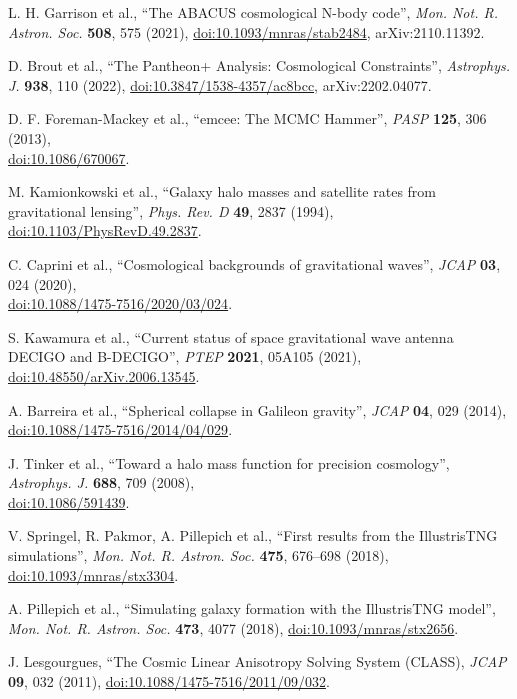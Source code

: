 \documentclass[aps,prd,twocolumn,superscriptaddress,nofootinbib,floatfix,preprintnumbers]{revtex4-2}
\begin{document}
\begin{thebibliography}{99}
L. H. Garrison et al.,
``The ABACUS cosmological N-body code'',
\emph{Mon. Not. R. Astron. Soc.} \textbf{508}, 575 (2021),
\href{https://doi.org/10.1093/mnras/stab2484}{doi:10.1093/mnras/stab2484},
arXiv:2110.11392.

D. Brout et al.,
``The Pantheon+ Analysis: Cosmological Constraints'',
\emph{Astrophys. J.} \textbf{938}, 110 (2022),
\href{https://doi.org/10.3847/1538-4357/ac8bcc}{doi:10.3847/1538-4357/ac8bcc},
arXiv:2202.04077.

D. F. Foreman-Mackey et al., 
``emcee: The MCMC Hammer'', 
\emph{PASP} \textbf{125}, 306 (2013), \\
\href{https://doi.org/10.1086/670067}{doi:10.1086/670067}.

M. Kamionkowski et al., 
``Galaxy halo masses and satellite rates from gravitational lensing'', 
\emph{Phys. Rev. D} \textbf{49}, 2837 (1994), \\
\href{https://doi.org/10.1103/PhysRevD.49.2837}{doi:10.1103/PhysRevD.49.2837}.

C. Caprini et al., 
``Cosmological backgrounds of gravitational waves'', 
\emph{JCAP} \textbf{03}, 024 (2020), \\
\href{https://doi.org/10.1088/1475-7516/2020/03/024}{doi:10.1088/1475-7516/2020/03/024}.

S. Kawamura et al., 
``Current status of space gravitational wave antenna DECIGO and B-DECIGO'', 
\emph{PTEP} \textbf{2021}, 05A105 (2021), \\
\href{https://doi.org/10.48550/arXiv.2006.13545}{doi:10.48550/arXiv.2006.13545}.

A. Barreira et al., 
``Spherical collapse in Galileon gravity'', 
\emph{JCAP} \textbf{04}, 029 (2014), \\
\href{https://doi.org/10.1088/1475-7516/2014/04/029}{doi:10.1088/1475-7516/2014/04/029}.

J. Tinker et al., 
``Toward a halo mass function for precision cosmology'', 
\emph{Astrophys. J.} \textbf{688}, 709 (2008), \\
\href{https://doi.org/10.1086/591439}{doi:10.1086/591439}.

V. Springel, R. Pakmor, A. Pillepich et al.,
``First results from the IllustrisTNG simulations'',
\emph{Mon. Not. R. Astron. Soc.} \textbf{475}, 676--698 (2018),
\href{https://doi.org/10.1093/mnras/stx3304}{doi:10.1093/mnras/stx3304}.

A. Pillepich et al., 
``Simulating galaxy formation with the IllustrisTNG model'', 
\emph{Mon. Not. R. Astron. Soc.} \textbf{473}, 4077 (2018),
\href{https://doi.org/10.1093/mnras/stx2656}{doi:10.1093/mnras/stx2656}.

J. Lesgourgues, 
``The Cosmic Linear Anisotropy Solving System (CLASS), 
\emph{JCAP} \textbf{09}, 032 (2011),
\href{https://doi.org/10.1088/1475-7516/2011/09/032}{doi:10.1088/1475-7516/2011/09/032}.

\end{thebibliography}
\end{document}
